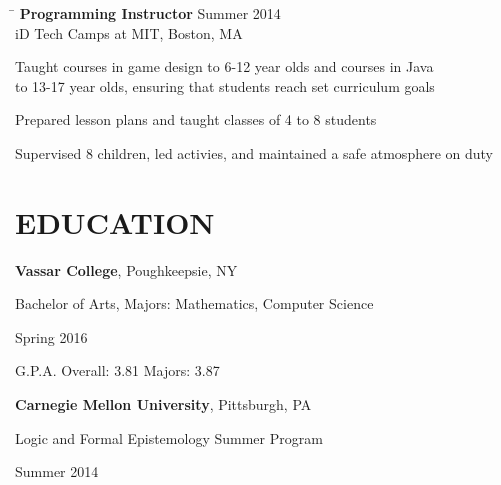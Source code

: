 \documentclass{res}
\begin{document}
\begin{resume}
{    \vspace{-12pt}
    \begin{tabbing}
      \hspace{5in}\=  \kill %
      {\bf Programming Instructor}%
      \>Summer 2014\\
      iD Tech Camps at MIT, Boston, MA\\     
    \end{tabbing}
    \vspace{-24pt}      %
    \begin{list}{-}{}
      \setlength{\itemsep}{-2pt}
      \item Taught courses in game design to 6-12 year olds and
            courses in Java\\ to 13-17 year olds, ensuring that
            students reach set curriculum goals
      \item Prepared lesson plans and taught classes of 4 to 8
            students
      \item Supervised 8 children, led activies, and maintained a safe
            atmosphere on duty
    \end{list}
    \vspace{-4pt}

  \section{EDUCATION}
    \vspace{3pt} %
    {\bf Vassar College}, Poughkeepsie, NY\\%
    \begin{minipage}{5in}
      Bachelor of Arts, Majors: Mathematics, Computer Science
    \end{minipage}
    \begin{minipage}{2in}
      Spring 2016
    \end{minipage}
    G.P.A. Overall: 3.81  Majors: 3.87

    \vspace{-5pt} %
    {\bf Carnegie Mellon University}, Pittsburgh, PA\\%
    \begin{minipage}{5in}
      Logic and Formal Epistemology Summer Program
    \end{minipage}
    \begin{minipage}{2in}
      Summer 2014
    \end{minipage}

}
\end{resume}
\end{document}
